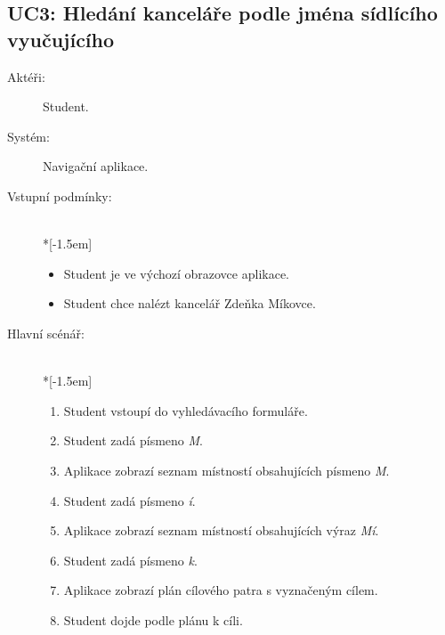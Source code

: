 \subsection{UC3: Hledání kanceláře podle jména sídlícího vyučujícího}
\begin{description}
\item[Aktéři:] Student.
\item[Systém:] Navigační aplikace.
\item[Vstupní podmínky:] ~\\*[-1.5em]
 \begin{itemize}
 \item Student je ve výchozí obrazovce aplikace.
 \item Student chce nalézt kancelář Zdeňka Míkovce.
 \end{itemize}
\item[Hlavní scénář:] ~\\*[-1.5em]
 \begin{enumerate}
 \item Student vstoupí do vyhledávacího formuláře.
 \item Student zadá písmeno \emph{M}.
 \item Aplikace zobrazí seznam místností obsahujících písmeno \emph{M}.
 \item Student zadá písmeno \emph{í}.
 \item Aplikace zobrazí seznam místností obsahujících výraz \emph{Mí}.
 \item Student zadá písmeno \emph{k}.
 \item Aplikace zobrazí plán cílového patra s vyznačeným cílem.
 \item Student dojde podle plánu k cíli.
 \end{enumerate}
\end{description}

